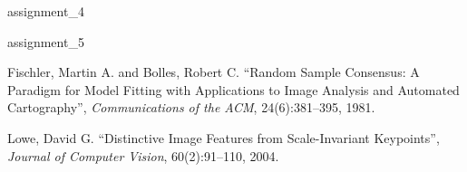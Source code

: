 \documentclass[a4paper,psfig,subfigure,epsfig,ausarbeitung,amssmb,float,caption,fontenc]{article}
\begin{document}
%
%


 {assignment_4}
\FloatBarrier %

 {assignment_5}
\FloatBarrier %


\fontsize{9}{10pt}


\begin{thebibliography}{10}

Fischler, Martin A. and Bolles, Robert C.
\newblock ``Random Sample Consensus: A Paradigm for Model Fitting with Applications to Image Analysis and Automated Cartography'',
\newblock \textit{Communications of the ACM}, 24(6):381--395, 1981.

Lowe, David G.
\newblock ``Distinctive Image Features from Scale-Invariant Keypoints'',
\newblock \textit{Journal of Computer Vision}, 60(2):91--110, 2004.

\end{thebibliography}
\end{document}
